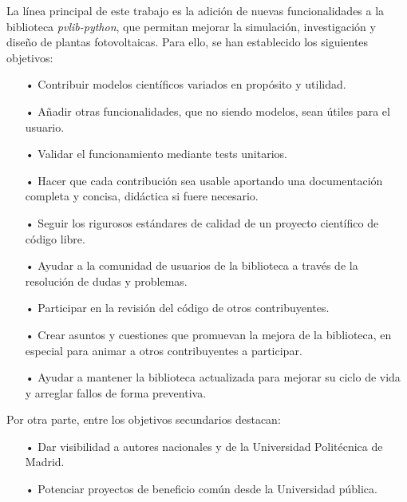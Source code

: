 La línea principal de este trabajo es la adición de nuevas funcionalidades a la biblioteca \textit{pvlib-python}, que permitan mejorar la simulación, investigación y diseño de plantas fotovoltaicas. Para ello, se han establecido los siguientes objetivos:

\begin{itemize}

    \item[•] Contribuir modelos científicos variados en propósito y utilidad.

    \item[•] Añadir otras funcionalidades, que no siendo modelos, sean útiles para el usuario.

    \item[•] Validar el funcionamiento mediante tests unitarios.

    \item[•] Hacer que cada contribución sea usable aportando una documentación completa y concisa, didáctica si fuere necesario.

    \item[•] Seguir los rigurosos estándares de calidad de un proyecto científico de código libre.

    \item[•] Ayudar a la comunidad de usuarios de la biblioteca a través de la resolución de dudas y problemas.

    \item[•] Participar en la revisión del código de otros contribuyentes.

    \item[•] Crear asuntos y cuestiones que promuevan la mejora de la biblioteca, en especial para animar a otros contribuyentes a participar.

    \item[•] Ayudar a mantener la biblioteca actualizada para mejorar su ciclo de vida y arreglar fallos de forma preventiva.

\end{itemize}

Por otra parte, entre los objetivos secundarios destacan:

\begin{itemize}

    \item [•] Dar visibilidad a autores nacionales y de la Universidad Politécnica de Madrid.

    \item [•] Potenciar proyectos de beneficio común desde la Universidad pública.

\end{itemize}

